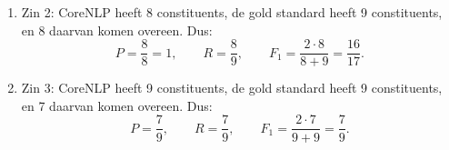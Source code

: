 \documentclass[11pt,a4paper]{article}
\begin{document}
\begin{enumerate}
\begin{enumerate}
  \item Zin 2: CoreNLP heeft 8 constituents, de gold standard heeft 9 constituents, en 8 daarvan komen overeen. Dus:
  \[
  P=\frac{8}{8}=1,
  \qquad R=\frac{8}{9},
  \qquad F_1=\frac{2\cdot 8}{8+9}=\frac{16}{17}.
  \]

  \item Zin 3: CoreNLP heeft 9 constituents, de gold standard heeft 9 constituents, en 7 daarvan komen overeen. Dus:
  \[
  P=\frac{7}{9},\qquad R=\frac{7}{9},\qquad F_1=\frac{2\cdot 7}{9+9}=\frac{7}{9}.
  \]
\end{enumerate}

\end{enumerate}

\end{document}
